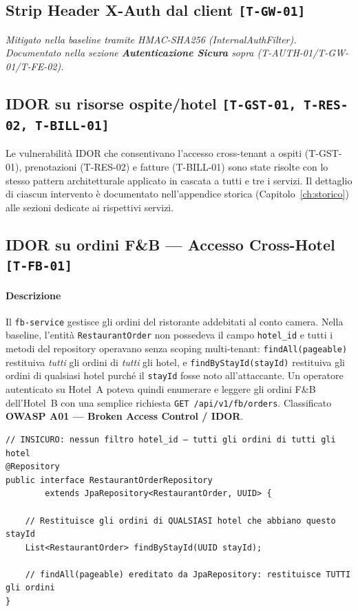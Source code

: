 ﻿\documentclass[a4paper,12pt]{report}
\newcommand{\threat}[1]{\texttt{\small\textcolor{vulnred}{[#1]}}}
\begin{document}
\subsection{Strip Header X-Auth dal client \threat{T-GW-01}}
\textit{Mitigato nella baseline tramite HMAC-SHA256 (InternalAuthFilter). Documentato nella
sezione \textbf{Autenticazione Sicura} sopra (T-AUTH-01/T-GW-01/T-FE-02).}

\subsection{IDOR su risorse ospite/hotel \threat{T-GST-01, T-RES-02, T-BILL-01}}
Le vulnerabilità IDOR che consentivano l'accesso cross-tenant a ospiti (T-GST-01),
prenotazioni (T-RES-02) e fatture (T-BILL-01) sono state risolte con lo stesso pattern
architetturale applicato in cascata a tutti e tre i servizi.
Il dettaglio di ciascun intervento è documentato nell'appendice storica
(Capitolo~\ref{ch:storico}) alle sezioni dedicate ai rispettivi servizi.

\subsection{IDOR su ordini F\&B --- Accesso Cross-Hotel \threat{T-FB-01}}

\paragraph{Descrizione}
Il \texttt{fb-service} gestisce gli ordini del ristorante addebitati al conto camera.
Nella baseline, l'entità \texttt{RestaurantOrder} non possedeva il campo \texttt{hotel\_id}
e tutti i metodi del repository operavano senza scoping multi-tenant:
\texttt{findAll(pageable)} restituiva \emph{tutti} gli ordini di \emph{tutti} gli hotel,
e \texttt{findByStayId(stayId)} restituiva gli ordini di qualsiasi hotel purché il
\texttt{stayId} fosse noto all'attaccante.
Un operatore autenticato su Hotel~A poteva quindi enumerare e leggere gli ordini F\&B
dell'Hotel~B con una semplice richiesta \texttt{GET /api/v1/fb/orders}.
Classificato \textbf{OWASP A01 --- Broken Access Control / IDOR}.

\begin{insecurebox}[title={Codice Vulnerabile --- RestaurantOrderRepository.java (baseline)}]
\begin{lstlisting}[style=java]
// INSICURO: nessun filtro hotel_id — tutti gli ordini di tutti gli hotel
@Repository
public interface RestaurantOrderRepository
        extends JpaRepository<RestaurantOrder, UUID> {

    // Restituisce gli ordini di QUALSIASI hotel che abbiano questo stayId
    List<RestaurantOrder> findByStayId(UUID stayId);

    // findAll(pageable) ereditato da JpaRepository: restituisce TUTTI gli ordini
}
\end{lstlisting}
\end{insecurebox}
\end{document}
